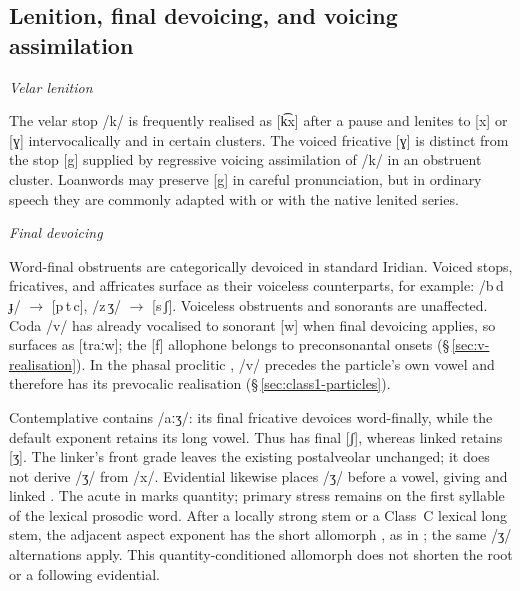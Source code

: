 \subsection{Lenition, final devoicing, and voicing assimilation}\label{sec:lenition}

\noindent\textit{Velar lenition}\quad

The velar stop /k/ is frequently realised as [k͡x] after a pause and lenites to
[x] or [ɣ] intervocalically and in certain clusters. The voiced fricative
[ɣ] is distinct from the stop [g] supplied by regressive voicing assimilation
of /k/ in an obstruent cluster. Loanwords may preserve [g] in
careful pronunciation, but in ordinary speech they are commonly adapted with
 or with the native lenited series.

\noindent\textit{Final devoicing}\quad

Word-final obstruents are categorically devoiced in standard Iridian. Voiced
stops, fricatives, and affricates surface as their voiceless counterparts, for example:
/b\,d\,ɟ/ $\rightarrow$ [p\,t\,c], /z\,ʒ/ $\rightarrow$ [s\,ʃ].
Voiceless obstruents and sonorants are unaffected. Coda /v/ has already
vocalised to sonorant [w] when final devoicing applies, so 
surfaces as [traːw]; the [f] allophone belongs to preconsonantal onsets
(§\,\ref{sec:v-realisation}). In the phasal proclitic
, /v/ precedes the particle's own vowel and therefore has its
prevocalic realisation (§\,\ref{sec:class1-particles}).

Contemplative  contains /aːʒ/: its final fricative
devoices word-finally, while the default exponent retains its long vowel. Thus
 has final [ʃ], whereas
linked  retains
[ʒ]. The linker's front grade leaves the existing postalveolar unchanged;
it does not derive /ʒ/ from /x/. Evidential  likewise places
/ʒ/ before a vowel, giving 
and linked .
The acute in  marks quantity; primary stress remains on the
first syllable of the lexical prosodic word.
After a locally strong stem or a Class~C lexical long stem, the adjacent
aspect exponent has the short allomorph , as in
; the same /ʒ/ alternations apply. This quantity-conditioned
allomorph does not shorten the root or a following evidential.

